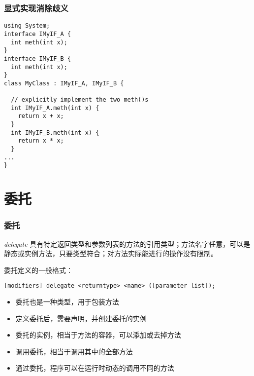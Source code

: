 \begin{frame}[fragile]
\frametitle{显式实现消除歧义}
\begin{lstlisting}
using System;
interface IMyIF_A {
  int meth(int x);
}
interface IMyIF_B {
  int meth(int x);
}
class MyClass : IMyIF_A, IMyIF_B {

  // explicitly implement the two meth()s
  int IMyIF_A.meth(int x) {
    return x + x;
  }
  int IMyIF_B.meth(int x) {
    return x * x;
  }
...
}
\end{lstlisting}


\end{frame}

\section{委托}

\begin{frame}[fragile]
\frametitle{委托}
  \begin{block}{\textit{delegate}}
    \CJKindent 具有特定返回类型和参数列表的方法的引用类型；方法名字任意，可以是
    静态或实例方法，只要类型符合；对方法实际能进行的操作没有限制。
  \end{block}
委托定义的一般格式：
\begin{lstlisting}
[modifiers] delegate <returntype> <name> ([parameter list]);
\end{lstlisting} 

  \begin{itemize}
  \item 委托也是一种类型，用于包装方法
  \item 定义委托后，需要声明，并创建委托的实例
  \item 委托的实例，相当于方法的容器，可以添加或去掉方法
  \item 调用委托，相当于调用其中的全部方法
  \item 通过委托，程序可以在运行时动态的调用不同的方法
  \end{itemize}
\end{frame}

